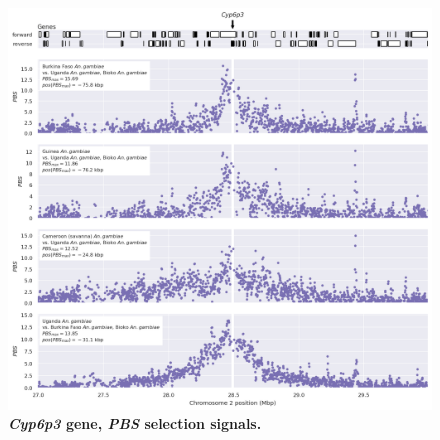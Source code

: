 \documentclass[a4paper,11pt,abstracton,hidelinks]{scrartcl}
\begin{document}
\clearpage
\begin{figure}[t!]
	\begin{center}
		\includegraphics*[width=1.1\linewidth,center]{artwork/locus_cyp6p3_pbs.png}
	\end{center}
	\caption[\textit{Cyp6p3} gene, \textit{PBS} selection signals]{
	\textbf{\textit{Cyp6p3} gene, \textit{PBS} selection signals.} 
	} 
	\label{fig:locus_cyp6p3_pbs}
\end{figure}


\clearpage
\end{document}
